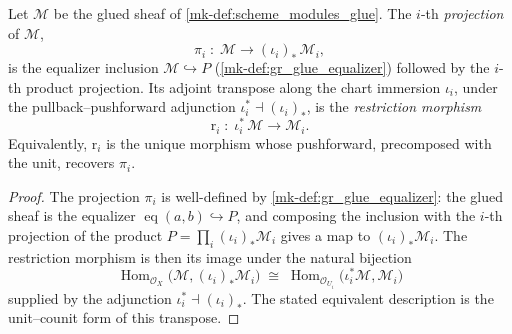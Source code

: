 \begin{lemma}\label{mk-lem:glueRestrictionHom}
  \leanok

  Let \(\mathcal{M}\) be the glued sheaf of \ref{mk-def:scheme_modules_glue}. The
  \(i\)-th \emph{projection} of \(\mathcal{M}\),
  \[
    \pi_i \;:\; \mathcal{M} \longrightarrow (\iota_i)_{*}\,\mathcal{M}_i,
  \]
  is the equalizer inclusion \(\mathcal{M} \hookrightarrow P\)
  (\ref{mk-def:gr_glue_equalizer}) followed by the \(i\)-th product projection. Its
  adjoint transpose along the chart immersion \(\iota_i\), under the
  pullback--pushforward adjunction \(\iota_i^{*} \dashv (\iota_i)_{*}\), is the
  \emph{restriction morphism}
  \[
    \mathrm{r}_i \;:\; \iota_i^{*}\,\mathcal{M} \longrightarrow \mathcal{M}_i .
  \]
  Equivalently, \(\mathrm{r}_i\) is the unique morphism whose pushforward, precomposed
  with the unit, recovers \(\pi_i\).
\end{lemma}
\begin{proof}
  \leanok
  The projection \(\pi_i\) is well-defined by \ref{mk-def:gr_glue_equalizer}: the glued
  sheaf is the equalizer \(\operatorname{eq}(a,b) \hookrightarrow P\), and composing
  the inclusion with the \(i\)-th projection of the product \(P = \prod_i
  (\iota_i)_{*}\mathcal{M}_i\) gives a map to \((\iota_i)_{*}\mathcal{M}_i\). The
  restriction morphism is then its image under the natural bijection
  \[
    \operatorname{Hom}_{\mathcal{O}_X}\bigl(\mathcal{M}, (\iota_i)_{*}\mathcal{M}_i\bigr)
      \;\cong\;
    \operatorname{Hom}_{\mathcal{O}_{U_i}}\bigl(\iota_i^{*}\mathcal{M}, \mathcal{M}_i\bigr)
  \]
  supplied by the adjunction \(\iota_i^{*} \dashv (\iota_i)_{*}\). The stated
  equivalent description is the unit--counit form of this transpose.
\end{proof}


